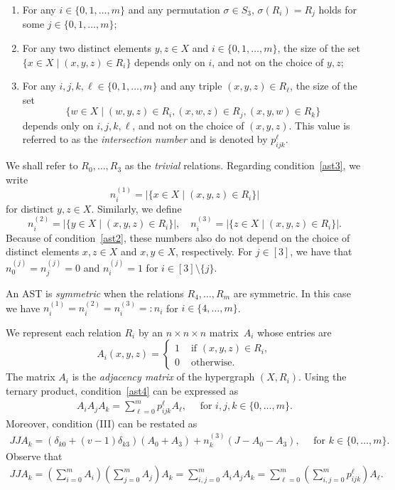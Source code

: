 \documentclass[11pt,oneside]{amsart}
\begin{document}
{\begin{enumerate}[label=(\Roman*)]
    \item\label{ast2} For any $i\in\{0,1,\ldots,m\}$ and any permutation $\sigma\in S_3$,
    $\sigma(R_i)=R_j$ holds for some $j\in\{0,1,\ldots,m\}$; 
    \item\label{ast3} For any two distinct elements $y,z\in X$ and $i\in \{0,1,\ldots,m\}$, the size of the set $\{x\in X \mid (x,y,z)\in R_i\}$ depends only on $i$, and not on the choice of $y,z$;
    \item\label{ast4} For any $i,j,k,\ell\in\{0,1,\ldots,m\}$ and any triple $(x,y,z)\in R_\ell$, the size of the set
    \[
    \{w\in X \mid (w,y,z)\in R_i,(x,w,z)\in R_j,(x,y,w)\in R_k\}
    \]
    depends only on $i,j,k,\ell$, and not on the choice of $(x,y,z)$.
    This value is referred to as the \emph{intersection number} and is denoted by $p_{ijk}^{\ell}$.
\end{enumerate}
We shall refer to $R_0,\dots,R_3$ as the {\it trivial} relations. Regarding condition~\ref{ast3}, we write
\[
n_i^{(1)}=|\{x\in X \mid (x,y,z)\in R_i\}|
\]
for distinct $y,z\in X$. Similarly, we define
\[
n_i^{(2)}=|\{y\in X \mid (x,y,z)\in R_i\}|, \quad
n_i^{(3)}=|\{z\in X \mid (x,y,z)\in R_i\}|. 
\]
Because of condition~\ref{ast2}, these numbers also do not depend on the choice of
distinct elements $x,z\in X$ and $x,y\in X$, respectively. For $j\in [3]$, we have
that $n_0^{(j)}=n_j^{(j)}=0$ and $n_i^{(j)}=1$ for $i\in[3]\setminus \{j\}$.


An AST is  \emph{symmetric} when the relations $R_4,\dots,R_m$ are symmetric. In this case we have $n_i^{(1)} = n_i^{(2)} = n_i^{(3)} =: n_i$ for  $i \in \{4,\ldots,m\}$.

We represent each relation
$R_i$ by  an $n\times n\times n$ matrix~$A_i$ whose  entries are
\[
A_i(x,y,z)=\begin{cases}
    1 & \text{ if }(x,y,z)\in R_i,\\
    0 & \text{ otherwise}.
\end{cases}
\]
The matrix $A_i$ is the \emph{adjacency matrix} of the hypergraph $(X,R_i)$. %
Using the ternary product, condition~\ref{ast4}  can
be expressed as
\begin{align} \label{lincombast}
    A_i A_j A_k =\sum_{\ell=0}^m p_{ijk}^\ell A_\ell, \quad \mbox{ for  }i,j,k\in \{0,\ldots,m\}.
\end{align}
Moreover, condition (III) can
be restated as %
   \begin{align}\label{eq:jja}
    JJA_k=(\delta_{k0}+(v-1)\delta_{k3})(A_0+A_3)+n_k^{(3)}\left(J-A_0-A_3\right) , \quad \mbox{ for  }k\in \{0,\ldots,m\}.
    \end{align}
Observe that 
    \begin{align*}
      JJA_k=  \left(\sum_{i=0}^m A_i\right)\left(\sum_{j=0}^m A_j \right)A_k=\sum_{i,j=0}^m A_iA_jA_k=\sum_{\ell=0}^m\left(\sum_{i,j=0}^m p_{ijk}^\ell\right) A_\ell. 
    \end{align*}

}
\end{document}
